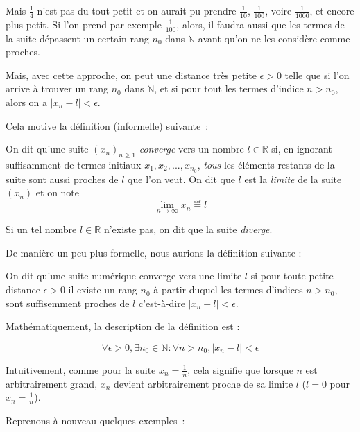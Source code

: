 Mais $\frac{1}{4}$ n'est pas du tout petit et on aurait pu prendre $\frac{1}{10}$, $\frac{1}{100}$, voire $\frac{1}{1000}$, et encore plus petit. Si l’on prend par exemple $\frac{1}{100}$, alors, il faudra aussi que les termes de la suite dépassent un certain rang $n_0$ dans $\mathbb{N}$ avant qu’on ne les considère comme proches.

Mais, avec cette approche, on peut une distance très petite $\epsilon > 0$ telle que si l'on arrive à trouver un rang $n_0$ dans $\mathbb{N}$, et si pour tout les termes d'indice $n > n_0$, alors on a $\lvert x_n - l\rvert < \epsilon$.

Cela motive la définition (informelle) suivante~:

\begin{boxdef}
On dit qu'une suite $(x_n)_{n \geq 1}$ \emph{converge} vers un nombre $l \in \mathbb R$ si, en ignorant suffisamment de termes initiaux $x_1, x_2, ..., x_{n_0}$, \emph{tous} les éléments restants de la suite sont aussi proches de $l$ que l'on veut. On dit que $l$ est la \emph{limite} de la suite $(x_n)$ et on note 
\[
\lim \limits_{n \to \infty} x_n \eqdef l
\]

Si un tel nombre $l \in \mathbb R$ n'existe pas, on dit que la suite \emph{diverge}.
\label{def:convergence}
\end{boxdef}

De manière un peu plus formelle, nous aurions la définition suivante :

\begin{boxdef}
On dit qu'une suite numérique converge vers une limite $l$ si pour toute petite distance $\epsilon > 0$ il existe un rang $n_0$ à partir duquel les termes d'indices $n> n_0$, sont suffisemment proches de $l$ c'est-à-dire $\lvert x_n - l \rvert < \epsilon$.


Mathématiquement, la description de la définition est :

$$\forall \epsilon > 0 , \exists n_0 \in \mathbb{N} : \forall n > n_0, \lvert x_n - l \rvert < \epsilon$$

\label{def:convergence}
\end{boxdef}


Intuitivement, comme pour la suite $x_n = \frac{1}{n}$, cela signifie que lorsque $n$ est arbitrairement grand, $x_n$ devient arbitrairement proche de sa limite $l$ ($l = 0$ pour $x_n = \frac{1}{n}$). 



Reprenons à nouveau quelques exemples~:

